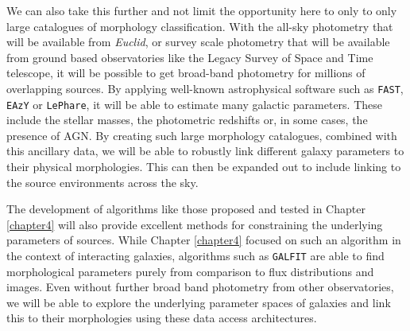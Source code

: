 We can also take this further and not limit the opportunity here to only to only large catalogues of morphology classification. With the all-sky photometry that will be available from \emph{Euclid}, or survey scale photometry that will be available from ground based observatories like the Legacy Survey of Space and Time telescope, it will be possible to get broad-band photometry for millions of overlapping sources. By applying well-known astrophysical software such as \texttt{FAST}, \texttt{EAzY} or \texttt{LePhare}, it will be able to estimate many galactic parameters. These include the stellar masses, the photometric redshifts or, in some cases, the presence of AGN. By creating such large morphology catalogues, combined with this ancillary data, we will be able to robustly link different galaxy parameters to their physical morphologies. This can then be expanded out to include linking to the source environments across the sky. 

The development of algorithms like those proposed and tested in Chapter \ref{chapter4} will also provide excellent methods for constraining the underlying parameters of sources. While Chapter \ref{chapter4} focused on such an algorithm in the context of interacting galaxies, algorithms such as \texttt{GALFIT} are able to find morphological parameters purely from comparison to flux distributions and images. Even without further broad band photometry from other observatories, we will be able to explore the underlying parameter spaces of galaxies and link this to their morphologies using these data access architectures. 

